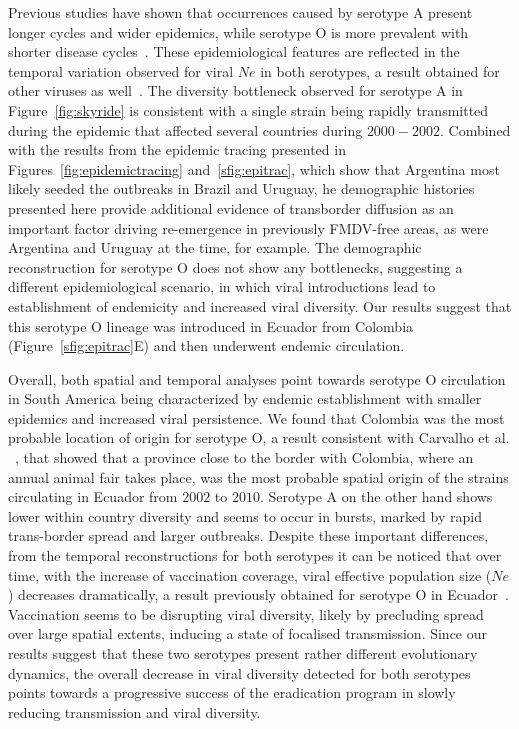 \documentclass[10pt]{article}
\begin{document}
Previous studies have shown that occurrences caused by serotype A present longer cycles and wider epidemics, while serotype O is more prevalent with shorter disease cycles~\cite{colombiatime}.
These epidemiological features are reflected in the temporal variation observed for viral $Ne$ in both serotypes, a result obtained for other viruses as well~\cite{Bennett2010,Pybus2003}. 
The diversity bottleneck observed for serotype A in Figure~\ref{fig:skyride} is consistent with a single strain being rapidly transmitted during the epidemic that affected several countries during $2000-2002$.
Combined with the results from the epidemic tracing presented in Figures~\ref{fig:epidemictracing} and~\ref{sfig:epitrac}, which show that Argentina most likely seeded the outbreaks in Brazil and Uruguay, he demographic histories presented here provide additional evidence of transborder diffusion as an important factor driving re-emergence in previously FMDV-free areas, as were Argentina and Uruguay at the time, for example.
The demographic reconstruction for serotype O does not show any bottlenecks, suggesting a different epidemiological scenario, in which viral introductions lead to establishment of endemicity and increased viral diversity.
Our results suggest that this serotype O lineage was introduced in Ecuador from Colombia (Figure~\ref{sfig:epitrac}E) and then underwent endemic circulation.

Overall, both spatial and temporal analyses point towards serotype O circulation in South America being characterized by endemic establishment with smaller epidemics and increased viral persistence. 
We found that Colombia was the most probable location of origin for serotype O, a result consistent with  Carvalho et al. ~\cite{Carvalho2013}, that showed that a province close to the border with Colombia, where an annual animal fair takes place, was the most probable spatial origin of the strains circulating in Ecuador from $2002$ to $2010$.
Serotype A on the other hand shows lower within country diversity and seems to occur in bursts, marked by rapid trans-border spread and larger outbreaks. 
Despite these important differences, from the temporal reconstructions for both serotypes it can be noticed that over time, with the increase of vaccination coverage, viral effective population size ($Ne$) decreases dramatically, a result previously obtained for serotype O in Ecuador~\cite{Carvalho2013}.
Vaccination seems to be disrupting viral diversity, likely by precluding spread over large spatial extents, inducing a state of focalised transmission.
Since our results suggest that these two serotypes present rather different evolutionary dynamics, the overall decrease in viral diversity detected for both serotypes points towards a progressive success of the eradication program in slowly reducing transmission and viral diversity.
\end{document}
